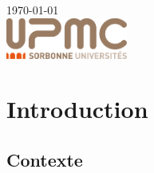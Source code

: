 \documentclass[a4paper,8pt]{report}
\begin{document}
\begin{titlepage}

{\large \today}\\[3cm] %


 

\vfill %
\includegraphics[width=4cm]{images/upmc.png}\\[1cm] %
\end{titlepage}

\renewcommand{\contentsname}{Sommaire}
\tableofcontents
\listoffigures

\chapter{Introduction}


\section*{Contexte}\label{sec:name}
\end{document}
